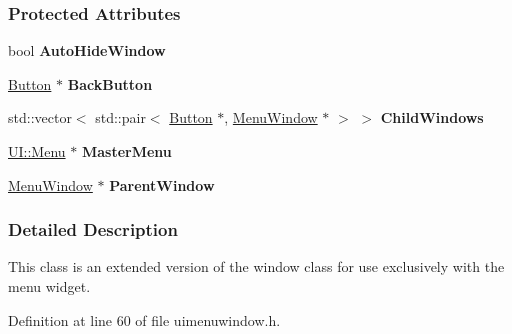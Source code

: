 \subsubsection*{Protected Attributes}
\begin{DoxyCompactItemize}
\item 
\hypertarget{classMezzanine_1_1UI_1_1MenuWindow_a2b6ae12c79b59f95f441bbe938517ec6}{
bool {\bfseries AutoHideWindow}}
\label{classMezzanine_1_1UI_1_1MenuWindow_a2b6ae12c79b59f95f441bbe938517ec6}

\item 
\hypertarget{classMezzanine_1_1UI_1_1MenuWindow_abf02d5129945bc0a8b9cc2b28843cff5}{
\hyperlink{classMezzanine_1_1UI_1_1Button}{Button} $\ast$ {\bfseries BackButton}}
\label{classMezzanine_1_1UI_1_1MenuWindow_abf02d5129945bc0a8b9cc2b28843cff5}

\item 
\hypertarget{classMezzanine_1_1UI_1_1MenuWindow_ab9c1010dd5bc91f3a09969d4ad33118b}{
std::vector$<$ std::pair$<$ \hyperlink{classMezzanine_1_1UI_1_1Button}{Button} $\ast$, \hyperlink{classMezzanine_1_1UI_1_1MenuWindow}{MenuWindow} $\ast$ $>$ $>$ {\bfseries ChildWindows}}
\label{classMezzanine_1_1UI_1_1MenuWindow_ab9c1010dd5bc91f3a09969d4ad33118b}

\item 
\hypertarget{classMezzanine_1_1UI_1_1MenuWindow_ae0e9b3d5e3611a572d9dc321f8399f2a}{
\hyperlink{classMezzanine_1_1UI_1_1Menu}{UI::Menu} $\ast$ {\bfseries MasterMenu}}
\label{classMezzanine_1_1UI_1_1MenuWindow_ae0e9b3d5e3611a572d9dc321f8399f2a}

\item 
\hypertarget{classMezzanine_1_1UI_1_1MenuWindow_af661be0bbaecc5e9975aae1664cd006a}{
\hyperlink{classMezzanine_1_1UI_1_1MenuWindow}{MenuWindow} $\ast$ {\bfseries ParentWindow}}
\label{classMezzanine_1_1UI_1_1MenuWindow_af661be0bbaecc5e9975aae1664cd006a}

\end{DoxyCompactItemize}


\subsubsection{Detailed Description}
This class is an extended version of the window class for use exclusively with the menu widget. 

Definition at line 60 of file uimenuwindow.h.



